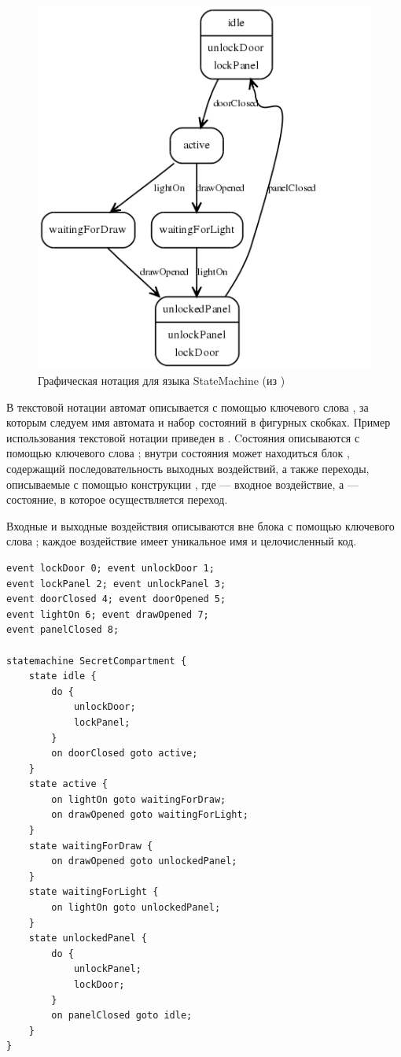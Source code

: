 \begin{figure}[htbp]
	\centering
	\includegraphics[scale=.7]{smgraph.png}
	\caption{Графическая нотация для языка StateMachine (из \cite{???})}\label{SM}
\end{figure}

В текстовой нотации автомат описывается с помощью ключевого слова , за которым следуем имя автомата и набор состояний в фигурных скобках. Пример использования текстовой нотации приведен в . Cостояния описываются с помощью ключевого слова ; внутри состояния может находиться блок , содержащий последовательность выходных воздействий, а также переходы, описываемые с помощью конструкции , где  --- входное воздействие, а  --- состояние, в которое осуществляется переход.

Входные и выходные воздействия описываются вне блока  с помощью ключевого слова ; каждое воздействие имеет уникальное имя и целочисленный код.

\begin{lstlisting}[label=SMText,float=htbp,caption=Текстовая нотация языка StateMachine]
event lockDoor 0; event unlockDoor 1;
event lockPanel 2; event unlockPanel 3;
event doorClosed 4; event doorOpened 5;
event lightOn 6; event drawOpened 7;
event panelClosed 8;

statemachine SecretCompartment {
	state idle {
		do {
			unlockDoor;
			lockPanel;
		}
		on doorClosed goto active;
	}
	state active {
		on lightOn goto waitingForDraw;
		on drawOpened goto waitingForLight;
	}
	state waitingForDraw {
		on drawOpened goto unlockedPanel;
	}
	state waitingForLight {
		on lightOn goto unlockedPanel;
	}
	state unlockedPanel {
		do {
			unlockPanel;
			lockDoor;
		}
		on panelClosed goto idle;
	}
}
\end{lstlisting}

